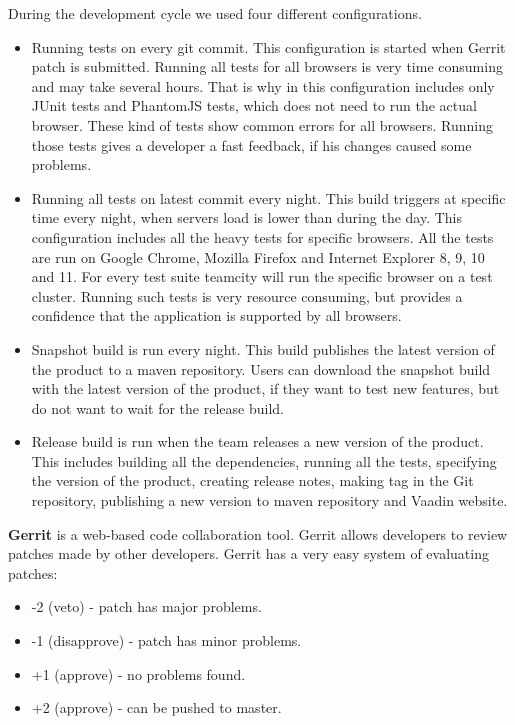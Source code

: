   During the development cycle we used four different configurations.
  \begin{itemize}
  \item Running tests on every git commit. This configuration is started when Gerrit patch is submitted.
   Running all tests for all browsers is very time consuming and may take several hours. 
   That is why in this configuration includes only JUnit tests and PhantomJS
   tests, which does not need to run the actual browser. These kind of tests show common errors for all browsers.
   Running those tests gives a developer a fast feedback, if his changes caused some problems.
   \item Running all tests on latest commit every night. This build triggers at
    specific time every night, when servers load is lower than during the day.
    This configuration includes all the heavy tests for specific browsers. All
    the tests are run on Google Chrome, Mozilla Firefox and Internet Explorer 8, 9, 10 and 11. 
    For every test suite teamcity will run the specific browser on a test
    cluster. Running such tests is very resource consuming, but provides a
    confidence that the application is supported by all browsers.
    \item Snapshot build is run every night. This build publishes the latest
    version of the product to a maven repository.  Users can download
    the snapshot build with the latest version of the product, if they want to
    test new features, but do not want to wait for the release build.
    \item Release build is run when the team releases a new version of the
    product. This includes building all the dependencies, running all the tests,
    specifying the version of the product, creating release notes, making tag in
    the Git repository, publishing a new version to maven repository and Vaadin
    website.
   \end{itemize}

\textbf{Gerrit} is a web-based code collaboration tool. Gerrit allows developers to
  review patches made by other developers. Gerrit has a very easy system of evaluating patches:
  \begin{itemize}
  \item -2 (veto) - patch has major problems.
  \item -1 (disapprove) - patch has minor problems.
  \item +1 (approve) - no problems found.
  \item +2 (approve) - can be pushed to master.
  \end{itemize}
  
